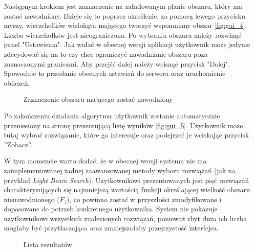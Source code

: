 \documentclass[twoside]{iisthesis}
\begin{document}
Następnym krokiem jest zaznaczenie na załadowanym planie obszaru, który ma zostać nawodniony. Dzieje się to poprzez określenie, za pomocą lewego przycisku myszy, wierzchołków wielokąta mającego tworzyć wspomniany obszar \eqref{fig:gui_4}. Liczba wierzchołków jest nieograniczona. Po wybraniu obszaru należy rozwinąć panel "Ustawienia". Jak widać w obecnej wersji aplikacji użytkownik może jedynie zdecydować się na to czy chce ograniczyć nawadnianie obszaru poza zaznaczonymi granicami. Aby przejść dalej należy wcisnąć przycisk "Dalej". Spowoduje to przesłanie obecnych ustawień do serwera oraz uruchomienie obliczeń.
\begin{figure}[!htb]
	\centering
	\caption{Zaznaczenie obszaru mającego zostać nawodniony}
	\label{fig:gui_4}
\end{figure}

Po zakończeniu działania algorytmu użytkownik zostanie automatycznie przeniesiony na stronę prezentującą listę wyników \eqref{fig:gui_5}. Użytkownik może tutaj wybrać rozwiązanie, które go interesuje oraz podejrzeć je wciskając przycisk ''Zobacz''.

W tym momencie warto dodać, że w obecnej wersji systemu nie ma zaimplementowanej żadnej zaawansowanej metody wyboru rozwiązań (jak na przykład \textit{Light Beam Search}). Użytkownikowi prezentowanych jest pięć rozwiązań charakteryzujących się najmniejszą wartością funkcji określającej wielkość obszaru nienawodnionego ($F_{1}$), co powinno zostać w przyszłości zmodyfikowane i dopasowane do potrzeb konkretnego użytkownika. System nie pokazuje użytkownikowi wszystkich znalezionych rozwiązań, ponieważ zbyt duża ich liczba mogłaby być przytłaczająca oraz zmniejszałaby przejrzystość interfejsu.

\begin{figure}[!htb]
	\centering
	\caption{Lista rezultatów}
	\label{fig:gui_5}
\end{figure}
\end{document}

